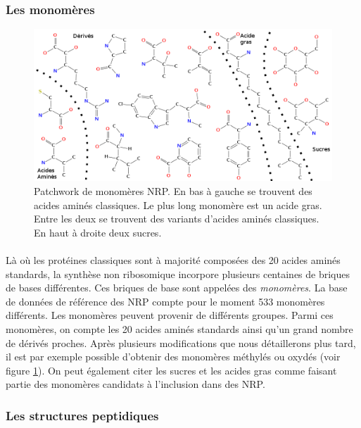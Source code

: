 \documentclass[12pt,french,twoside]{report}
\begin{document}
\subsubsection{Les monomères}

\begin{figure}[h!]
  \begin{center}
    \includegraphics[width=450px]{Figures/bio/Intro/monos/monos.png}
    \caption{\label{monomers_example}Patchwork de monomères NRP.
    En bas à gauche se trouvent des acides aminés classiques.
    Le plus long monomère est un acide gras.
    Entre les deux se trouvent des variants d'acides aminés classiques.
    En haut à droite deux  sucres.}
  \end{center}
\end{figure}

\paragraph{}Là où les protéines classiques sont à majorité composées des 20 acides aminés standards, la synthèse non ribosomique incorpore plusieurs centaines de briques de bases différentes.
Ces briques de base sont appelées des {\em monomères}.
La base de données de référence des NRP compte pour le moment 533 monomères différents.
Les monomères peuvent provenir de différents groupes.
Parmi ces monomères, on compte les 20 acides aminés standards ainsi qu'un grand nombre de dérivés proches.
Après plusieurs modifications que nous détaillerons plus tard, il est par exemple possible d'obtenir des monomères méthylés ou oxydés (voir figure \ref{monomers_example}).
On peut également citer les sucres et les acides gras comme faisant partie des monomères candidats à l'inclusion dans des NRP.


\subsubsection{Les structures peptidiques}
\end{document}

